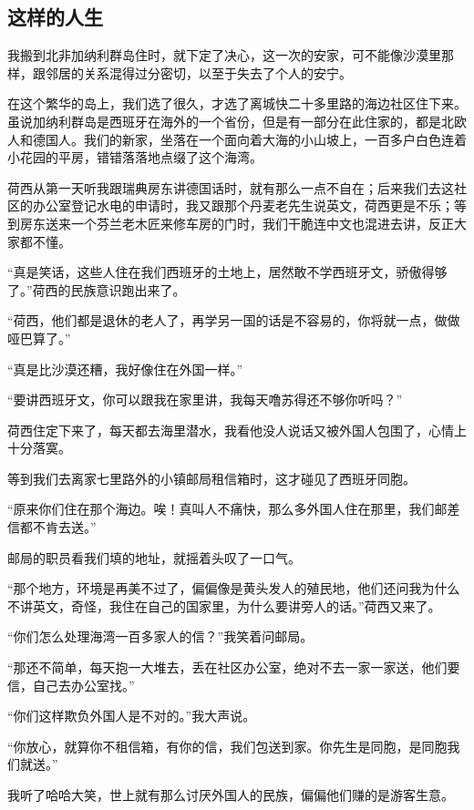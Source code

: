 \subsection{这样的人生}

\par 我搬到北非加纳利群岛住时，就下定了决心，这一次的安家，可不能像沙漠里那样，跟邻居的关系混得过分密切，以至于失去了个人的安宁。
\par 在这个繁华的岛上，我们选了很久，才选了离城快二十多里路的海边社区住下来。虽说加纳利群岛是西班牙在海外的一个省份，但是有一部分在此住家的，都是北欧人和德国人。我们的新家，坐落在一个面向着大海的小山坡上，一百多户白色连着小花园的平房，错错落落地点缀了这个海湾。
\par 荷西从第一天听我跟瑞典房东讲德国话时，就有那么一点不自在；后来我们去这社区的办公室登记水电的申请时，我又跟那个丹麦老先生说英文，荷西更是不乐；等到房东送来一个芬兰老木匠来修车房的门时，我们干脆连中文也混进去讲，反正大家都不懂。
\par “真是笑话，这些人住在我们西班牙的土地上，居然敢不学西班牙文，骄傲得够了。”荷西的民族意识跑出来了。
\par “荷西，他们都是退休的老人了，再学另一国的话是不容易的，你将就一点，做做哑巴算了。”
\par “真是比沙漠还糟，我好像住在外国一样。”
\par “要讲西班牙文，你可以跟我在家里讲，我每天噜苏得还不够你听吗？”
\par 荷西住定下来了，每天都去海里潜水，我看他没人说话又被外国人包围了，心情上十分落寞。
\par 等到我们去离家七里路外的小镇邮局租信箱时，这才碰见了西班牙同胞。
\par “原来你们住在那个海边。唉！真叫人不痛快，那么多外国人住在那里，我们邮差信都不肯去送。”
\par 邮局的职员看我们填的地址，就摇着头叹了一口气。
\par “那个地方，环境是再美不过了，偏偏像是黄头发人的殖民地，他们还问我为什么不讲英文，奇怪，我住在自己的国家里，为什么要讲旁人的话。”荷西又来了。
\par “你们怎么处理海湾一百多家人的信？”我笑着问邮局。
\par “那还不简单，每天抱一大堆去，丢在社区办公室，绝对不去一家一家送，他们要信，自己去办公室找。”
\par “你们这样欺负外国人是不对的。”我大声说。
\par “你放心，就算你不租信箱，有你的信，我们包送到家。你先生是同胞，是同胞我们就送。”
\par 我听了哈哈大笑，世上就有那么讨厌外国人的民族，偏偏他们赚的是游客生意。
